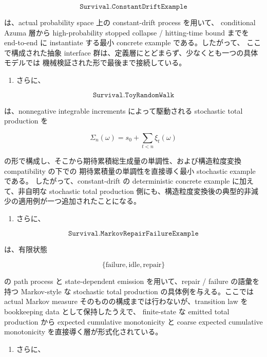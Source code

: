 \documentclass[12pt,a4paper]{article}
\begin{document}
\[
\texttt{Survival.ConstantDriftExample}
\]

は、actual probability space 上の constant-drift process を用いて、 conditional Azuma 層から high-probability stopped collapse / hitting-time bound までを end-to-end に instantiate する最小 concrete example である。したがって、 ここで構成された抽象 interface 群は、定義層にとどまらず、少なくとも一つの具体モデルでは 機械検証された形で最後まで接続している。

\begin{enumerate}
\def\labelenumi{\arabic{enumi}.}
\setcounter{enumi}{10}
\tightlist
\item
  さらに、
\end{enumerate}

\[
\texttt{Survival.ToyRandomWalk}
\]

は、nonnegative integrable increments によって駆動される stochastic total production を

\[
\Sigma_{n}(\omega)=s_0+\sum_{t<n}\xi_{t}(\omega)
\]

の形で構成し、そこから期待累積総生成量の単調性、および構造粒度変換 compatibility の下での 期待累積量の単調性を直接導く最小 stochastic example である。 したがって、constant-drift の deterministic concrete example に加えて、非自明な stochastic total production 側にも、構造粒度変換後の典型的非減少の適用例が一つ追加されたことになる。

\begin{enumerate}
\def\labelenumi{\arabic{enumi}.}
\setcounter{enumi}{11}
\tightlist
\item
  さらに、
\end{enumerate}

\[
\texttt{Survival.MarkovRepairFailureExample}
\]

は、有限状態

\[
\{\text{failure}, \text{idle}, \text{repair}\}
\]

の path process と state-dependent emission を用いて、repair / failure の語彙を持つ Markov-style な stochastic total production の具体例を与える。ここでは actual Markov measure そのものの構成までは行わないが、transition law を bookkeeping data として保持したうえで、 finite-state な emitted total production から expected cumulative monotonicity と coarse expected cumulative monotonicity を直接導く層が形式化されている。

\begin{enumerate}
\def\labelenumi{\arabic{enumi}.}
\setcounter{enumi}{12}
\tightlist
\item
  さらに、
\end{enumerate}
\end{document}
